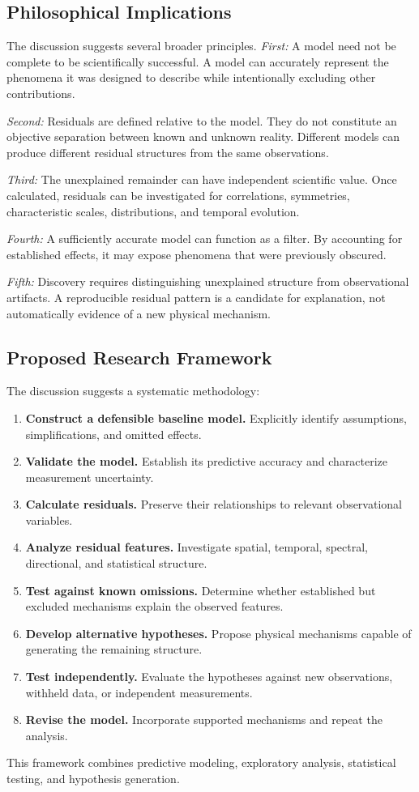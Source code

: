 \subsection{Philosophical Implications}
The discussion suggests several broader principles.
\textit{First:} A model need not be complete to be scientifically successful. A model can accurately represent the phenomena it was designed to describe while intentionally excluding other contributions.

\textit{Second:} Residuals are defined relative to the model. They do not constitute an objective separation between known and unknown reality. Different models can produce different residual structures from the same observations.

\textit{Third:} The unexplained remainder can have independent scientific value. Once calculated, residuals can be investigated for correlations, symmetries, characteristic scales, distributions, and temporal evolution.

\textit{Fourth:} A sufficiently accurate model can function as a filter. By accounting for established effects, it may expose phenomena that were previously obscured.

\textit{Fifth:} Discovery requires distinguishing unexplained structure from observational artifacts. A reproducible residual pattern is a candidate for explanation, not automatically evidence of a new physical mechanism.

\subsection{Proposed Research Framework}
The discussion suggests a systematic methodology:
\begin{enumerate}\setlength\itemsep{0pt}
\item \textbf{Construct a defensible baseline model.} Explicitly identify assumptions, simplifications, and omitted effects.
\item \textbf{Validate the model.} Establish its predictive accuracy and characterize measurement uncertainty.
\item \textbf{Calculate residuals.} Preserve their relationships to relevant observational variables.
\item \textbf{Analyze residual features.} Investigate spatial, temporal, spectral, directional, and statistical structure.
\item \textbf{Test against known omissions.} Determine whether established but excluded mechanisms explain the observed features.
\item \textbf{Develop alternative hypotheses.} Propose physical mechanisms capable of generating the remaining structure.
\item \textbf{Test independently.} Evaluate the hypotheses against new observations, withheld data, or independent measurements.
\item \textbf{Revise the model.} Incorporate supported mechanisms and repeat the analysis.
\end{enumerate}
This framework combines predictive modeling, exploratory analysis, statistical testing, and hypothesis generation.
